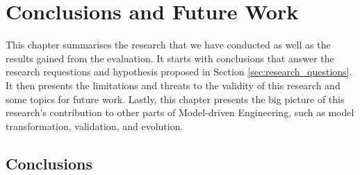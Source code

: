 \chapter{Conclusions and Future Work}
\label{ch:conclusions_and_future_work}

This chapter summarises the research that we have conducted as well as the results gained from the evaluation. It starts with conclusions that answer the research requestions and hypothesis proposed in Section \ref{sec:research_questions}. It then presents the limitations and threats to the validity of this research and some topics for future work. Lastly, this chapter presents the big picture of this research's contribution to other parts of Model-driven Engineering, such as model transformation, validation, and evolution. 

\section{Conclusions}
\label{conclusions_overall}

